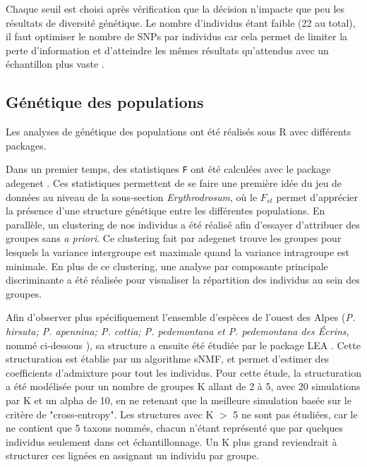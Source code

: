Chaque seuil est choisi après vérification que la décision n'impacte que peu les résultats de diversité génétique.
 Le nombre d'individus étant faible (22 au total), il faut optimiser le nombre de SNPs par individus car cela permet de limiter la perte d'information et d'atteindre les mêmes résultats qu'attendus avec un échantillon plus vaste \citep{Nazareno2017}.


\subsection{Génétique des populations}

Les analyses de génétique des populations ont été réalisés sous R avec différents packages. 

Dans un premier temps, des statistiques \verb|F| ont été calculées avec le package adegenet \citep{Jombart2011}. Ces statistiques permettent de se faire une première idée du jeu de données au niveau de la sous-section \textit{Erythrodrosum}, où le $F_{st}$ permet d'apprécier la présence d'une structure génétique entre les différentes populations.
 En parallèle, un clustering de nos individus a été réalisé afin d'essayer d'attribuer des groupes sans \textit{a priori}. Ce clustering fait par adegenet trouve les groupes pour lesquels la variance intergroupe est maximale quand la variance intragroupe est minimale. En plus de ce clustering, une analyse par composante principale discriminante a été réalisée pour visualiser la répartition des individus au sein des groupes.

Afin d'observer plus spécifiquement l'ensemble d'espèces de l'ouest des Alpes (\textit{P. hirsuta; P. apennina; P. cottia; P. pedemontana et P. pedemontana des Écrins}, nommé ci-dessous ), sa structure a ensuite été étudiée par le package LEA \citep{Frichot2015}. Cette structuration est établie par un algorithme sNMF, et permet d'estimer des coefficients d'admixture pour tout les individus. Pour cette étude, la structuration a été modélisée pour un nombre de groupes K allant de 2 à 5, avec 20 simulations par K et un alpha de 10, en ne retenant que la meilleure simulation basée sur le critère de "cross-entropy". Les structures avec K $>$ 5 ne sont pas étudiées, car le  ne contient que 5 taxons nommés, chacun n'étant représenté que par quelques individus seulement dans cet échantillonnage. Un K plus grand reviendrait à structurer ces lignées en assignant un individu par  groupe.

